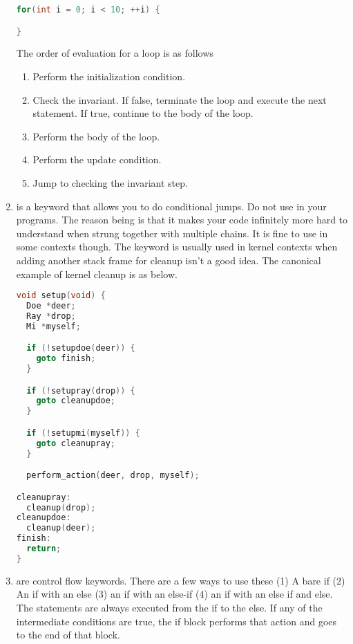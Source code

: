 \begin{enumerate}
	      \begin{lstlisting}[language=C]
for(int i = 0; i < 10; ++i) {

}
\end{lstlisting}

	      The order of evaluation for a  loop is as follows

	      \begin{enumerate}
		      \item Perform the initialization condition.
		      \item Check the invariant. If false, terminate the loop and execute the next statement. If true, continue to the body of the loop.
		      \item Perform the body of the loop.
		      \item Perform the update condition.
		      \item Jump to checking the invariant step.
	      \end{enumerate}

	    \item {} is a keyword that allows you to do conditional jumps.
        Do not use  in your programs.
        The reason being is that it makes your code infinitely more hard to understand when strung together with multiple chains.
        It is fine to use in some contexts though.
        The keyword is usually used in kernel contexts when adding another stack frame for cleanup isn't a good idea.
        The canonical example of kernel cleanup is as below.

	      \begin{lstlisting}[language=C]
void setup(void) {
  Doe *deer;
  Ray *drop;
  Mi *myself;

  if (!setupdoe(deer)) {
    goto finish;
  }

  if (!setupray(drop)) {
    goto cleanupdoe;
  }

  if (!setupmi(myself)) {
    goto cleanupray;
  }

  perform_action(deer, drop, myself);

cleanupray:
  cleanup(drop);
cleanupdoe:
  cleanup(deer);
finish:
  return;
}
\end{lstlisting}
	    \item {} are control flow keywords.
        There are a few ways to use these (1) A bare if (2) An if with an else (3) an if with an else-if (4) an if with an else if and else.
        The statements are always executed from the if to the else.
        If any of the intermediate conditions are true, the if block performs that action and goes to the end of that block.


\end{enumerate}
